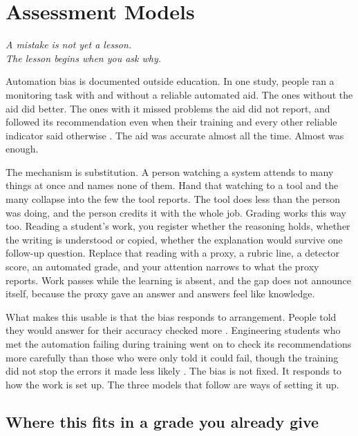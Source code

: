 \documentclass{SIAMbook2023}
\newcommand{\bookepigraph}[1]{%
  \begin{center}%
    \begin{minipage}{0.78\textwidth}%
      \centering\itshape #1%
    \end{minipage}%
  \end{center}%
  \vspace{0.6em}%
}
\begin{document}
\chapter{Assessment Models}
\label{i:ch:assessment-models}%

\bookepigraph{A mistake is not yet a lesson.\\The lesson begins when you ask why.}

Automation bias is documented outside education. In one study, people ran a monitoring task with and without a reliable automated aid. The ones without the aid did better. The ones with it missed problems the aid did not report, and followed its recommendation even when their training and every other reliable indicator said otherwise \citep{skitka1999does}. The aid was accurate almost all the time. Almost was enough.

The mechanism is substitution. A person watching a system attends to many things at once and names none of them. Hand that watching to a tool and the many collapse into the few the tool reports. The tool does less than the person was doing, and the person credits it with the whole job. Grading works this way too. Reading a student's work, you register whether the reasoning holds, whether the writing is understood or copied, whether the explanation would survive one follow-up question. Replace that reading with a proxy, a rubric line, a detector score, an automated grade, and your attention narrows to what the proxy reports. Work passes while the learning is absent, and the gap does not announce itself, because the proxy gave an answer and answers feel like knowledge.

What makes this usable is that the bias responds to arrangement. People told they would answer for their accuracy checked more \citep{skitka2000accountability}. Engineering students who met the automation failing during training went on to check its recommendations more carefully than those who were only told it could fail, though the training did not stop the errors it made less likely \citep{bahner2008misuse}. The bias is not fixed. It responds to how the work is set up. The three models that follow are ways of setting it up.

\section{Where this fits in a grade you already give}
\label{i:sec:grade-formula}%
\end{document}
